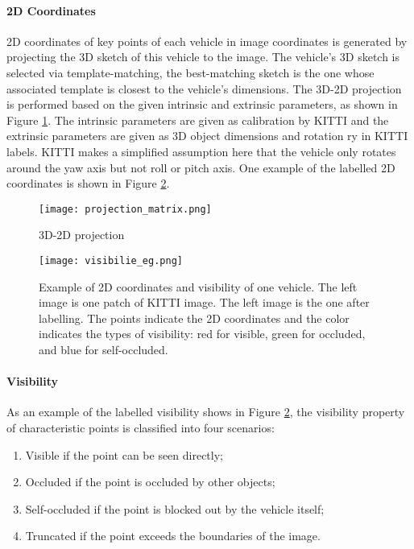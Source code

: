 \paragraph{2D Coordinates}

2D coordinates of key points of each vehicle in image coordinates is generated by projecting the 3D sketch of this vehicle to the image. The vehicle's 3D sketch is selected via template-matching, \ie the best-matching sketch is the one whose associated template is closest to the vehicle's dimensions. The 3D-2D projection is performed based on the given intrinsic and extrinsic parameters, as shown in Figure \ref{3D_2D_projection}. The intrinsic parameters are given as calibration by KITTI and the extrinsic parameters are given as 3D object dimensions and rotation ry in KITTI labels. KITTI makes a simplified assumption here that the vehicle only rotates around the yaw axis but not roll or pitch axis. One example of the labelled 2D coordinates is shown in Figure \ref{visibilie_eg}.

\begin{figure}[h]		
	\texttt{[image: projection\_matrix.png]}
	\caption{3D-2D projection}
	\centering
	\label{3D_2D_projection}
\end{figure}

\begin{figure}[h]		
	\texttt{[image: visibilie\_eg.png]}
	\caption{Example of 2D coordinates and visibility of one vehicle. The left image is one patch of KITTI image. The left image is the one after labelling. The points indicate the 2D coordinates and the color indicates the types of visibility: red for visible, green for occluded, and blue for self-occluded.}
	\centering
	\label{visibilie_eg}
\end{figure}



\paragraph{Visibility}
\label{visibility}

As an example of the labelled visibility shows in Figure \ref{visibilie_eg}, the visibility property of characteristic points is classified into four scenarios: 

\begin{enumerate}[\hspace{0.4cm} i.]
	\itemsep-0.5em 
	\item Visible if the point can be seen directly;
	\item Occluded if the point is occluded by other objects;
	\item Self-occluded if the point is blocked out by the vehicle itself;
	\item Truncated if the point exceeds the boundaries of the image. 
\end{enumerate}

